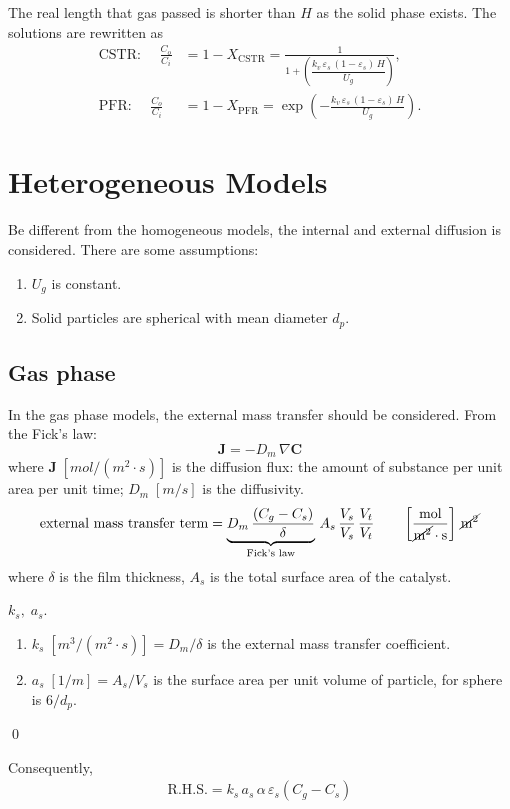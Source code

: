 The real length that gas passed is shorter than $H$ as the solid phase exists. The solutions are rewritten as 
\begin{align}
    \text{CSTR: }\quad
    \frac{C_o}{C_i} &= 1-X_\text{CSTR} 
    = \frac{1}{1+\left(\dfrac{k_v\, \varepsilon_s \,(1-\varepsilon_s) \, H}{U_g}\right)},
    \\
    \text{PFR: }\quad
    \frac{C_o}{C_i} &= 1-X_\text{PFR} 
    = \exp{\left( -\frac{k_v\, \varepsilon_s \, (1-\varepsilon_s) \, H}{U_g} \right)}.
\end{align}

\section{Heterogeneous Models}
Be different from the homogeneous models, the internal and external diffusion is considered. 
There are some assumptions: 
\begin{enumerate}
    \item $U_g$ is constant.
    \item Solid particles are spherical with mean diameter $d_p$.
\end{enumerate}

\subsection{Gas phase}
In the gas phase models, the external mass transfer should be considered. 
From the Fick's law: 
\begin{equation}
    \bm{J} = -D_m \, \nabla \bm{C}
\end{equation}
where $\bm{J}\; [\si{mol/(m^2\cdot s)}]$ is the diffusion flux: the amount of substance per unit area per unit time; 
$D_m \; [\si{m/s}]$ is the diffusivity.
\begin{align}
    \text{external mass transfer term} =
    \underbrace{D_m\,\frac{(C_g-C_s)}{\delta}}_{\text{Fick's law}}
    \,
    A_s 
    \,
    \frac{V_s}{V_s}\,\frac{V_t}{V_t}
    \qquad  \left[\frac{\si{mol}}{\cancel{\si{m^2}} \cdot \si{s}}\right]
            \,
            \cancel{\si{m^2}}
    \label{eq: external dif. - fixed bed}
\end{align}
where $\delta$ is the film thickness, 
$A_s$ is the total surface area of the catalyst.
\begin{definition}
    $k_s,\; a_s$.
    \begin{enumerate}
        \item $k_s\; [\si{m^3/(m^2\cdot s)}] = D_m/\delta$ is the external mass transfer coefficient.
        \item $a_s\; [\si{1/m}] = A_s/V_s$ is the surface area per unit volume of particle, for sphere is $6/d_p$.
    \end{enumerate}
    \qed
\end{definition}
Consequently, 
\begin{align}
    \text{R.H.S.} =
    k_s \, a_s \, \alpha \, \varepsilon_s (C_g - C_s)
    \label{eq: kinetics - accumulation term}
\end{align}

